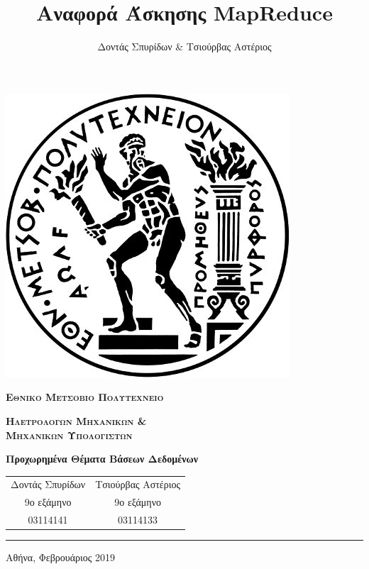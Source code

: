 \documentclass{ntua}
\title{Αναφορά Άσκησης MapReduce}
\author{Δοντάς Σπυρίδων \& Τσιούρβας Αστέριος}
\begin{document}
\begin{titlepage}
	\vspace{\fill}
	\centering
	\includegraphics[scale=0.4]{ntua.jpg}
	\par\vspace{1cm}
	{\scshape\Huge\bfseries Εθνικο Μετσοβιο Πολυτεχνειο}
	\par\vspace{1cm}
	{\scshape\LARGE\bfseries Ηλετρολογων Μηχανικων \& \\ Μηχανικων Υπολογιστων}
	\par\vspace{3cm}
	{\Large\bfseries Προχωρημένα Θέματα Βάσεων Δεδομένων}
	\par\vspace{1cm}
	{\Large\bfseries \thetitle}
	\par\vspace{1cm}
	\large
	\begin{tabular}[H]{cc}
		Δοντάς Σπυρίδων & Τσιούρβας Αστέριος \\
		9ο εξάμηνο & 9ο εξάμηνο \\
		03114141 & 03114133
	\end{tabular}
	\par\vspace{3cm}
	\rule[.5\baselineskip]{\textwidth}{.5pt}
	{\large Αθήνα, Φεβρουάριος 2019}
	\vspace{\fill}
\end{titlepage}

\tableofcontents

\newpage
\end{document}
